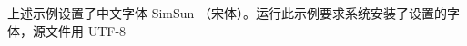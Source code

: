\documentclass{article}
\begin{document}
上述示例设置了中文字体
SimSun
（宋体）。运行此示例要求系统安装了设置的字体，源文件用
UTF-8
\end{document}
